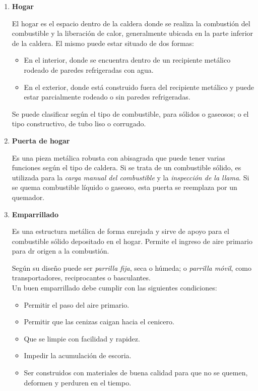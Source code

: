 \begin{enumerate}
	\item \textbf{Hogar} 
	
	El hogar es el espacio dentro de la caldera donde se realiza la combustión del combustible y la liberación de calor, generalmente ubicada en la parte inferior de la caldera. El mismo puede estar situado de dos formas:
	\begin{itemize}
		\item En el interior, donde se encuentra dentro de un recipiente metálico rodeado de paredes refrigeradas con agua.
		\item En el exterior, donde está construido fuera del recipiente metálico y puede estar parcialmente rodeado o sin paredes refrigeradas.
	\end{itemize}
	
	Se puede clasificar según el tipo de combustible, para sólidos o gaseosos; o el tipo constructivo, de tubo liso o corrugado.
	\item \textbf{Puerta de hogar}
	
	Es una pieza metálica robusta con abisagrada que puede tener varias funciones según el tipo de caldera. Si se trata de un combustible sólido, es utilizada para la \textit{carga manual del combustible} y la \textit{inspección de la llama}. Si se quema combustible líquido o gaseoso, esta puerta se reemplaza por un quemador.
	
	\item \textbf{Emparrillado}
	
	Es una estructura metálica de forma enrejada y sirve de apoyo para el combustible sólido depositado en el hogar. Permite el ingreso de aire primario para dr origen a la combustión.
	
	
	Según su diseño puede ser \textit{parrilla fija}, seca o húmeda; o \textit{parrilla móvil}, como transportadores, reciprocantes o basculantes.\\
	
	Un buen emparrillado debe cumplir con las siguientes condiciones:
	\begin{itemize}
		\item Permitir el paso del aire primario.
		\item Permitir que las cenizas caigan hacia el cenicero.
		\item Que se limpie con facilidad y rapidez.
		\item Impedir la acumulación de escoria.
		\item Ser construidos con materiales de buena calidad para que no se quemen, deformen y perduren en el tiempo.
	\end{itemize}


\end{enumerate}
